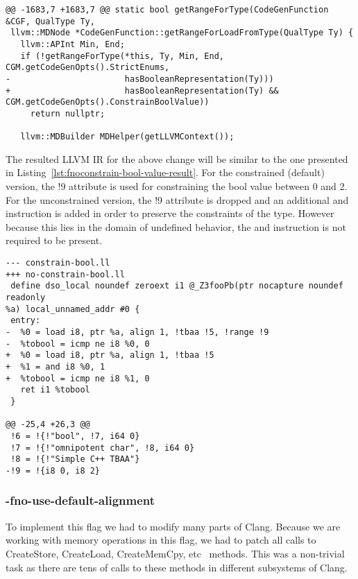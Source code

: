\begin{lstlisting}[style=Cstyle, caption={-fnoconstrain-bool-value
implementation}, label={lst:fnoconstrain-bool-value}]
@@ -1683,7 +1683,7 @@ static bool getRangeForType(CodeGenFunction &CGF, QualType Ty,
 llvm::MDNode *CodeGenFunction::getRangeForLoadFromType(QualType Ty) {
   llvm::APInt Min, End;
   if (!getRangeForType(*this, Ty, Min, End, CGM.getCodeGenOpts().StrictEnums,
-                       hasBooleanRepresentation(Ty)))
+                       hasBooleanRepresentation(Ty) && CGM.getCodeGenOpts().ConstrainBoolValue))
     return nullptr;

   llvm::MDBuilder MDHelper(getLLVMContext());
\end{lstlisting}

The resulted LLVM IR for the above change will be similar to the one presented
in Listing~\ref{lst:fnoconstrain-bool-value-result}. For the constrained
(default) version, the !9 attribute is used for constraining the bool value
between 0 and 2. For the unconstrained version, the !9 attribute is dropped and
an additional and instruction is added in order to preserve the constraints of
the type. However because this lies in the domain of undefined behavior, the and
instruction is not required to be present.

\begin{lstlisting}[style=Cstyle, caption={-fnoconstrain-bool-value
results}, label={lst:fnoconstrain-bool-value-result}]
--- constrain-bool.ll
+++ no-constrain-bool.ll
 define dso_local noundef zeroext i1 @_Z3fooPb(ptr nocapture noundef readonly
%a) local_unnamed_addr #0 {
 entry:
-  %0 = load i8, ptr %a, align 1, !tbaa !5, !range !9
-  %tobool = icmp ne i8 %0, 0
+  %0 = load i8, ptr %a, align 1, !tbaa !5
+  %1 = and i8 %0, 1
+  %tobool = icmp ne i8 %1, 0
   ret i1 %tobool
 }

@@ -25,4 +26,3 @@
 !6 = !{!"bool", !7, i64 0}
 !7 = !{!"omnipotent char", !8, i64 0}
 !8 = !{!"Simple C++ TBAA"}
-!9 = !{i8 0, i8 2}
\end{lstlisting}

\subsubsection{-fno-use-default-alignment}

To implement this flag we had to modify many parts of Clang. Because we are
working with memory operations in this flag, we had to patch all calls to
CreateStore, CreateLoad, CreateMemCpy, etc~\cite{cgbuilder} methods. This was
a non-trivial task as there are tens of calls to these methods in different
subsystems of Clang.

